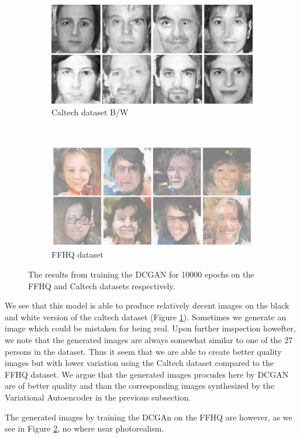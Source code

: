 \begin{figure}[h!]
    \centering
    \begin{subfigure}[b]{0.45\textwidth}
        \includegraphics[width=\textwidth]{fig/dcgan/caltech/epoch10000}
        \caption{Caltech dataset B/W}
        \label{dcgan-caltech}
    \end{subfigure}
    ~
    \begin{subfigure}[b]{0.45\textwidth}
        \includegraphics[width=\textwidth]{fig/dcgan/ffhq/epoch10000}
        \caption{FFHQ dataset}
        \label{dcgan-ffhq}
    \end{subfigure}
    \caption{The results from training the DCGAN for 10000 epochs on the FFHQ and Caltech datasets respectively.}
    \label{dcgan-results}
\end{figure}

We see that this model is able to produce relatively decent images on the black and white version of the caltech dataset (Figure \ref{dcgan-caltech}). Sometimes we generate an image which could be mistaken for being real. Upon further imspection howefter, we note that the generated images are always somewhat similar to one of the 27 persons in the dataset. Thus it seem that we are able to create better quality images but with lower variation using the Caltech dataset compared to the FFHQ dataset. We argue that the generated images procudes here by DCGAN are of better quality and than the corresponding images synthesized by the Variational Autoencoder in the previous subsection. 

The generated images by training the DCGAn on the FFHQ are however, as we see in Figure \ref{dcgan-ffhq}, no where near photorealism. 
